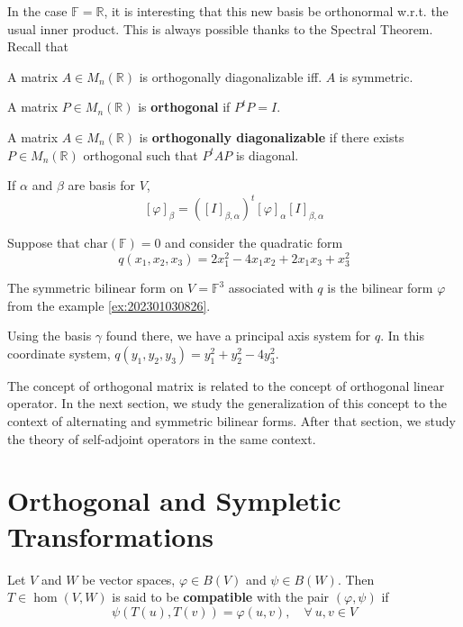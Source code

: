 In the case $\mathbb{F} = \mathbb{R}$, it is interesting that this new basis be orthonormal w.r.t. the usual inner product. This is always possible thanks to the Spectral Theorem. Recall that 

\begin{theorem}
A matrix $A \in M_n(\mathbb{R})$ is orthogonally diagonalizable iff. $A$ is symmetric. 
\end{theorem}

\begin{definition}
A matrix $P \in M_n(\mathbb{R})$ is \textbf{orthogonal} if $P^t P = I$. 

A matrix $A \in M_n(\mathbb{R})$ is \textbf{orthogonally diagonalizable} if there exists $P \in M_n(\mathbb{R})$ orthogonal such that $P^t A P$ is diagonal. 
\end{definition} 

\begin{theorem}
If $\alpha$ and $\beta$ are basis for $V$, 
\[
  [\varphi]_\beta = ([I]_{\beta, \alpha})^t [\varphi]_\alpha [I]_{\beta, \alpha}
\]
\end{theorem}

\begin{example}
  Suppose that $\text{char}(\mathbb{F}) = 0$ and consider the quadratic form 
  \[
    q(x_1, x_2, x_3) = 2x_1^2 - 4x_1 x_2 + 2x_1 x_3 + x_3^2
  \]

  The symmetric bilinear form on $V = \mathbb{F}^3$ associated with $q$ is the bilinear form $\varphi$ from the example \ref{ex:202301030826}.
  
  Using the basis $\gamma$ found there, we have a principal axis system for $q$. In this coordinate system, $q(y_1, y_2, y_3) = y_1^2 + y_2^2 - 4 y_3^2$.
\end{example}

The concept of orthogonal matrix is related to the concept of orthogonal linear operator. In the next section, we study the generalization of this concept to the context of alternating and symmetric bilinear forms. After that section, we study the theory of self-adjoint operators in the same context. 

\section{Orthogonal and Sympletic Transformations}

\begin{definition}[Compatibility]
  Let $V$ and $W$ be vector spaces, $\varphi \in B(V)$ and $\psi \in B(W)$. Then $T \in \hom(V,W)$ is said to be \textbf{compatible} with the pair $(\varphi, \psi)$ if 
  \[
    \psi(T(u), T(v)) = \varphi(u, v), \quad \forall ~u,v \in V
  \]
\end{definition}

